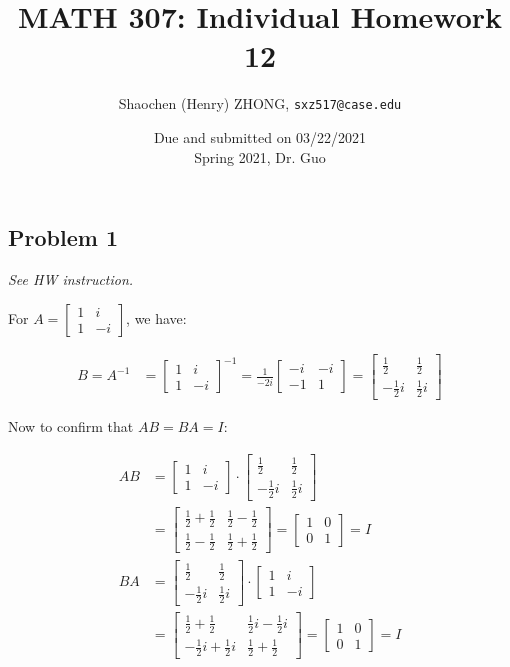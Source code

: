 \documentclass[11pt]{article}
\newcommand{\ilc}{\texttt}
\providecommand{\qbm}[1]{\begin{bmatrix} #1 \end{bmatrix}}
\begin{document}
\title{\textbf{MATH 307: Individual Homework 12}}


\author{Shaochen (Henry) ZHONG, \ilc{sxz517@case.edu}}

\date{Due and submitted on 03/22/2021 \\ Spring 2021, Dr. Guo}
\maketitle



\subsection*{Problem 1}
\textit{See HW instruction.}\newline

For $A = \qbm{1 & i \\ 1 & -i}$, we have:

\begin{align*}
    B = A^{-1} &= \qbm{1 & i \\ 1 & -i}^{-1} = \frac{1}{-2i} \qbm{-i & -i \\ -1 & 1} = \qbm{\frac{1}{2} & \frac{1}{2} \\ -\frac{1}{2}i & \frac{1}{2}i}
\end{align*}

Now to confirm that $AB = BA = I$:

\begin{align*}
    AB &= \qbm{1 & i \\ 1 & -i} \cdot \qbm{\frac{1}{2} & \frac{1}{2} \\ -\frac{1}{2}i & \frac{1}{2}i} \\
    &= \qbm{\frac{1}{2} + \frac{1}{2} & \frac{1}{2} - \frac{1}{2} \\ \frac{1}{2} - \frac{1}{2} & \frac{1}{2} + \frac{1}{2}} = \qbm{1 & 0 \\ 0 & 1} = I \\
    BA &= \qbm{\frac{1}{2} & \frac{1}{2} \\ -\frac{1}{2}i & \frac{1}{2}i} \cdot \qbm{1 & i \\ 1 & -i} \\
    &= \qbm{\frac{1}{2} + \frac{1}{2} & \frac{1}{2}i - \frac{1}{2}i \\ -\frac{1}{2}i + \frac{1}{2}i & \frac{1}{2} + \frac{1}{2}} = \qbm{1 & 0 \\ 0 & 1} = I \\
\end{align*}
\end{document}
